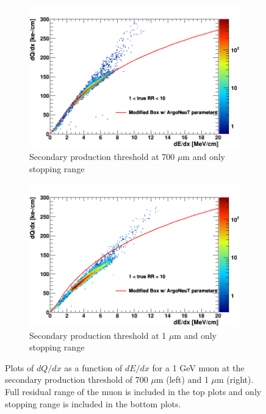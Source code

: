 \begin{figure}[htbp!]
\begin{subfigure}[b]{0.495\textwidth}
            \centering 
            \includegraphics[width=\textwidth]{mu_700um_lowRR}
            \caption{Secondary production threshold at 700 $\mu$m and only stopping range}%
            \label{fig:mu_2d_700_lowRR}
        \end{subfigure}
        \hfill
        \begin{subfigure}[b]{0.495\textwidth}   
            \centering 
            \includegraphics[width=\textwidth]{mu_1um_lowRR}
            \caption{Secondary production threshold at 1 $\mu$m and only stopping range}%
            \label{fig:mu_2d_1_lowRR}
        \end{subfigure}
        \caption{
        	Plots of $dQ/dx$ as a function of $dE/dx$ for a 1 GeV muon at the secondary production threshold of 700 $\mu$m (left) and 1 $\mu$m (right).
		Full residual range of the muon is included in the top plots and only stopping range is included in the bottom plots.
	}
        \label{fig:muon_2d}
\end{figure}
